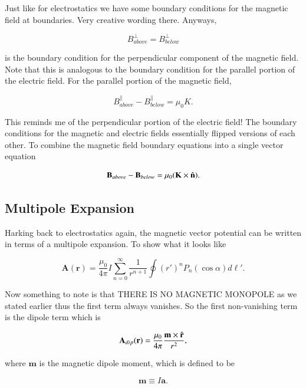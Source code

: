 \documentclass[preprint, review,12pt]{elsarticle}
\def\m{\frac{\mu_0}{4\pi}}
\def\x{\times}
\def\b{\textbf}
\def\bell{\bm{\ell}}
\def\={\equiv}
\newcommand{\hb}[1]{\hat{\b #1}}
\begin{document}
Just like for electrostatics we have some boundary conditions for the magnetic field at boundaries. Very creative wording there. Anyways, 

\begin{equation}
    B_{above}^\bot = B_{below}^\bot
\end{equation}

is the boundary condition for the perpendicular component of the magnetic field. Note that this is analogous to the boundary condition for the parallel portion of the electric field. For the parallel portion of the magnetic field,

\begin{equation}
    B_{above}^\parallel - B_{below}^\parallel = \mu_0 K.
\end{equation}

This reminds me of the perpendicular portion of the electric field! The boundary conditions for the magnetic and electric fields essentially flipped versions of each other. To combine the magnetic field boundary equations into a single vector equation

\begin{equation}
    \b{B}_{above} - \b{B}_{below}= \mu_0 (\b{K} \x \hb{n}).
\end{equation}

\subsection{Multipole Expansion}

Harking back to electrostatics again, the magnetic vector potential can be written in terms of a multipole expansion. To show what it looks like

\begin{equation}
    \b{A}(\b{r}) = \m I \sum_{n=0}^\infty \frac{1}{r^{n+1}}\oint (r')^n  P_n(\cos\alpha) d\bell '.
\end{equation}

Now something to note is that THERE IS NO MAGNETIC MONOPOLE as we stated earlier thus the first term always vanishes. So the first non-vanishing term is the dipole term which is

\begin{equation}
    \b{A}_{dip}(\b{r}) = \m \frac{\b{m} \x \hb{r}}{r^2},
\end{equation}

where $\b{m}$ is the magnetic dipole moment, which is defined to be

\begin{equation}
    \b{m} \= I\b{a}.
\end{equation}
\end{document}
